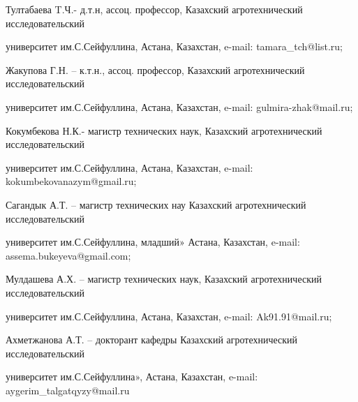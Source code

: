 \begin{noparindent}
Тултабаева T.Ч.- д.т.н, ассоц. профессор, Казахский агротехнический
исследовательский

университет им.С.Сейфуллина, Астана, Казахстан,
e-mail: tamara\_tch@list.ru;

Жакупова Г.Н. -- к.т.н., ассоц. профессор, Казахский агротехнический
исследовательский

университет им.С.Сейфуллина, Астана, Казахстан,
e-mail: gulmira-zhak@mail.ru;

Кокумбекова Н.К.- магистр технических наук, Казахский агротехнический
исследовательский

университет им.С.Сейфуллина, Астана, Казахстан,
e-mail: kokumbekovanazym@gmail.ru;

Сагандык А.Т. -- магистр технических нау Казахский агротехнический
исследовательский

университет им.С.Сейфуллина, младший» Астана,
Казахстан, e-mail: assema.bukeyeva@gmail.com;

Мулдашева А.Х. -- магистр технических наук, Казахский агротехнический
исследовательский

университет им.С.Сейфуллина, Астана, Казахстан,
e-mail: Ak91.91@mail.ru;

Ахметжанова А.Т. -- докторант кафедры Казахский агротехнический
исследовательский

университет им.С.Сейфуллина», Астана, Казахстан,
e-mail: aygerim\_talgatqyzy@mail.ru
\end{noparindent}
